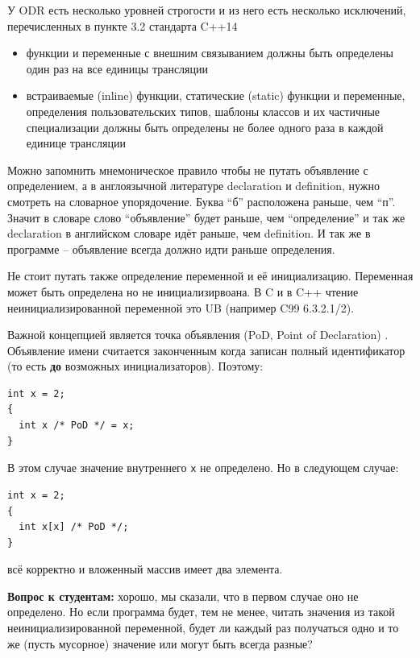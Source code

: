 \documentclass[a4paper,12pt,oneside]{article}
\begin{document}
У ODR есть несколько уровней строгости и из него есть несколько исключений, перечисленных в пункте 3.2 стандарта C++14

\begin{itemize}
\item функции и переменные с внешним связыванием должны быть определены один раз на все единицы трансляции
\item встраиваемые (inline) функции, статические (static) функции и переменные, определения пользовательских типов, шаблоны классов и их частичные специализации должны быть определены не более одного раза в каждой единице трансляции
\end{itemize}

Можно запомнить мнемоническое правило чтобы не путать объявление с определением, а в англоязычной литературе declaration и definition, нужно смотреть на словарное упорядочение.  Буква ``б'' расположена раньше, чем ``п''. Значит в словаре слово ``объявление'' будет раньше, чем ``определение'' и так же declaration в английском словаре идёт раньше, чем definition. И так же в программе – объявление всегда должно идти раньше определения.

Не стоит путать также определение переменной и её инициализацию. Переменная может быть определена но не инициализирвоана. В C и в C++ чтение неинициализированной переменной это UB (например C99 6.3.2.1/2).

Важной концепцией является точка объявления (PoD, Point of Declaration) . Объявление имени считается законченным когда записан полный идентификатор (то есть \textbf{до} возможных инициализаторов). Поэтому:

\begin{lstlisting}
int x = 2;
{
  int x /* PoD */ = x;
}
\end{lstlisting}

В этом случае значение внутреннего \lstinline!x! не определено. Но в следующем случае:

\begin{lstlisting}
int x = 2;
{
  int x[x] /* PoD */;
}
\end{lstlisting}

всё корректно и вложенный массив имеет два элемента.

\textbf{Вопрос к студентам:} хорошо, мы сказали, что в первом случае оно не определено. Но если программа будет, тем не менее, читать значения из такой неинициализированной переменной, будет ли каждый раз получаться одно и то же (пусть мусорное) значение или могут быть всегда разные?
\end{document}

